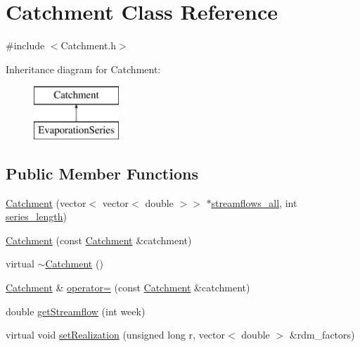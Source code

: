\hypertarget{classCatchment}{}\section{Catchment Class Reference}
\label{classCatchment}


{\ttfamily \#include $<$Catchment.\+h$>$}

Inheritance diagram for Catchment\+:\begin{figure}[H]
\begin{center}
\leavevmode
\includegraphics[height=2.000000cm]{classCatchment}
\end{center}
\end{figure}
\subsection*{Public Member Functions}
\begin{DoxyCompactItemize}
\item 
\mbox{\hyperlink{classCatchment_aafdee6ee868a8892314672abb119e60f_aafdee6ee868a8892314672abb119e60f}{Catchment}} (vector$<$ vector$<$ double $>$$>$ $\ast$\mbox{\hyperlink{classCatchment_a579ccda86831f286c19c76354e7125c3_a579ccda86831f286c19c76354e7125c3}{streamflows\+\_\+all}}, int \mbox{\hyperlink{classCatchment_a2d4994220f63b876348b4ce4892bc6d3_a2d4994220f63b876348b4ce4892bc6d3}{series\+\_\+length}})
\item 
\mbox{\hyperlink{classCatchment_ae311c4b2d857a8b5abc01f5317b04df2_ae311c4b2d857a8b5abc01f5317b04df2}{Catchment}} (const \mbox{\hyperlink{classCatchment}{Catchment}} \&catchment)
\item 
virtual \mbox{\hyperlink{classCatchment_a7c8073fc1dd2e2fa9fa8bfc68ce120bd_a7c8073fc1dd2e2fa9fa8bfc68ce120bd}{$\sim$\+Catchment}} ()
\item 
\mbox{\hyperlink{classCatchment}{Catchment}} \& \mbox{\hyperlink{classCatchment_a66d0f20f34893ea2df589e5cbce31fc4_a66d0f20f34893ea2df589e5cbce31fc4}{operator=}} (const \mbox{\hyperlink{classCatchment}{Catchment}} \&catchment)
\item 
double \mbox{\hyperlink{classCatchment_af4e8206ffab5c901e5e4cdd6136f73a1_af4e8206ffab5c901e5e4cdd6136f73a1}{get\+Streamflow}} (int week)
\item 
virtual void \mbox{\hyperlink{classCatchment_affb9042c5854a76efd864ce87d7d1877_affb9042c5854a76efd864ce87d7d1877}{set\+Realization}} (unsigned long r, vector$<$ double $>$ \&rdm\+\_\+factors)
\end{DoxyCompactItemize}

